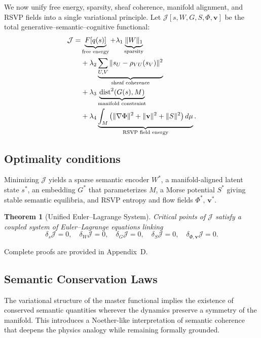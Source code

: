\documentclass[11pt,a4paper,twocolumn]{article}
\newtheorem{theorem}{Theorem}[section]
\begin{document}
We now unify free energy, sparsity, sheaf coherence, manifold
alignment, and RSVP fields into a single variational principle. Let
$\mathcal{J}[s, W, G, S, \Phi, \mathbf{v}]$ be the total
generative--semantic--cognitive functional:
\begin{align}
\mathcal{J}
= &\underbrace{F[q(s)]}_{\text{free energy}}
+ \lambda_1 \underbrace{\|W\|_1}_{\text{sparsity}} \notag \\
&+ \lambda_2 \underbrace{\sum_{U,V} \|s_U - \rho_{VU}(s_V)\|^2}_{\text{sheaf coherence}} \notag \\
&+ \lambda_3 \underbrace{\mathrm{dist}^2(G(s), M)}_{\text{manifold constraint}} \notag \\
&+ \lambda_4 \underbrace{\int_M \left(\|\nabla \Phi\|^2 + \|\mathbf{v}\|^2 + \|S\|^2\right) d\mu}_{\text{RSVP field energy}}.
\end{align}

\subsection{Optimality conditions}

Minimizing $\mathcal{J}$ yields a sparse semantic encoder $W^\ast$, a
manifold-aligned latent state $s^\ast$, an embedding $G^\ast$ that
parameterizes $M$, a Morse potential $S^\ast$ giving stable semantic
equilibria, and RSVP entropy and flow fields $\Phi^\ast,\,\mathbf{v}^\ast$.

\begin{theorem}[Unified Euler--Lagrange System]
Critical points of $\mathcal{J}$ satisfy a coupled system of
Euler--Lagrange equations linking
\[
\delta_s \mathcal{J} = 0, \quad
\delta_W \mathcal{J} = 0, \quad
\delta_G \mathcal{J} = 0, \quad
\delta_S \mathcal{J} = 0, \quad
\delta_{\Phi,\mathbf{v}} \mathcal{J} = 0.
\]
\end{theorem}

Complete proofs are provided in Appendix~D.

\subsection{Semantic Conservation Laws}

The variational structure of the master functional implies the
existence of conserved semantic quantities wherever the dynamics
preserve a symmetry of the manifold. This introduces a Noether-like
interpretation of semantic coherence that deepens the physics analogy
while remaining formally grounded.
\end{document}

